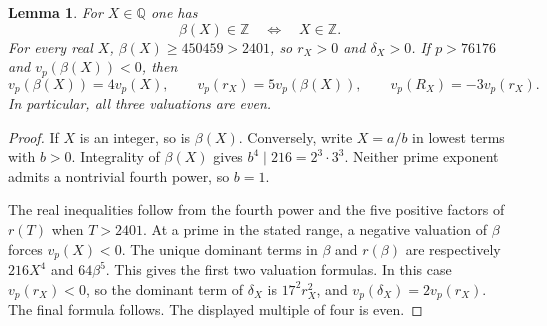 \documentclass[11pt,a4paper]{article}
\newtheorem{lemma}[theorem]{Lemma}
\theoremstyle{definition}
\theoremstyle{remark}
\begin{document}
\begin{lemma}\label{sn:integral-input}
For $X\in\mathbb Q$ one has
\[
                 \beta(X)\in\mathbb Z
                 \quad\Longleftrightarrow\quad X\in\mathbb Z.
\]
For every real $X$, $\beta(X)\ge450459>2401$, so $r_X>0$
and $\delta_X>0$.  If $p>76176$ and $v_p(\beta(X))<0$,
then
\[
 v_p(\beta(X))=4v_p(X),\qquad
 v_p(r_X)=5v_p(\beta(X)),\qquad
 v_p(R_X)=-3v_p(r_X).
\]
In particular, all three valuations are even.
\end{lemma}
\begin{proof}
If $X$ is an integer, so is $\beta(X)$.  Conversely, write
$X=a/b$ in lowest terms with $b>0$.  Integrality of $\beta(X)$
gives $b^4\mid216=2^3\cdot3^3$.  Neither prime exponent
admits a nontrivial fourth power, so $b=1$.

The real inequalities follow from the fourth power and the
five positive factors of $r(T)$ when $T>2401$.  At a prime
in the stated range, a negative valuation of $\beta$ forces
$v_p(X)<0$.  The unique dominant terms in $\beta$ and
$r(\beta)$ are respectively $216X^4$ and $64\beta^5$.
This gives the first two valuation formulas.  In this case
$v_p(r_X)<0$, so the dominant term of $\delta_X$ is
$17^2r_X^2$, and $v_p(\delta_X)=2v_p(r_X)$.  The final
formula follows.  The displayed multiple of four is even.
\end{proof}
\end{document}
